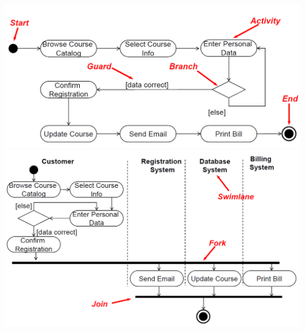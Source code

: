 \begin{multicols}{2}
	\includegraphics[width=\linewidth]{images/Modellierung/Aktivitaetsdiagramm1}
	\label{Bild3}
	\vfill\null
	\includegraphics[width=\linewidth]{images/Modellierung/Aktivitaetsdiagramm2}
	\label{Bild4}
\end{multicols}
